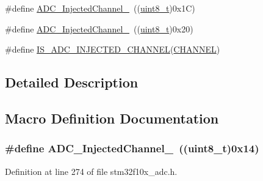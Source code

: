 \begin{DoxyCompactItemize}
\item 
\#define \hyperlink{group___a_d_c__injected__channel__selection_ga6bf03d805645b942bdcc53504e772cf1}{A\+D\+C\+\_\+\+Injected\+Channel\+\_}~((\hyperlink{_p_e___types_8h_aba7bc1797add20fe3efdf37ced1182c5}{uint8\+\_\+t})0x1\+C)
\item 
\#define \hyperlink{group___a_d_c__injected__channel__selection_ga31d18bbcfa7b685e90c3a1313d9c6406}{A\+D\+C\+\_\+\+Injected\+Channel\+\_}~((\hyperlink{_p_e___types_8h_aba7bc1797add20fe3efdf37ced1182c5}{uint8\+\_\+t})0x20)
\item 
\#define \hyperlink{group___a_d_c__injected__channel__selection_gae0bbfb5dbad0fbac8b672db6f63cf8d0}{I\+S\+\_\+\+A\+D\+C\+\_\+\+I\+N\+J\+E\+C\+T\+E\+D\+\_\+\+C\+H\+A\+N\+N\+EL}(\hyperlink{samr21__xpro_200std__low__power__mode_200std__low__power__mode_8c_ace6a11e892466500d47d1f45f042bc53}{C\+H\+A\+N\+N\+EL})
\end{DoxyCompactItemize}


\subsection{Detailed Description}


\subsection{Macro Definition Documentation}
\subsubsection[{\texorpdfstring{A\+D\+C\+\_\+\+Injected\+Channel\+\_\+1}{ADC_InjectedChannel_1}}]{\setlength{\rightskip}{0pt plus 5cm}\#define A\+D\+C\+\_\+\+Injected\+Channel\+\_~(({\bf uint8\+\_\+t})0x14)}\hypertarget{group___a_d_c__injected__channel__selection_ga8792d4ae0fa82dd317252c72815684ba}{}\label{group___a_d_c__injected__channel__selection_ga8792d4ae0fa82dd317252c72815684ba}


Definition at line 274 of file stm32f10x\+\_\+adc.\+h.

